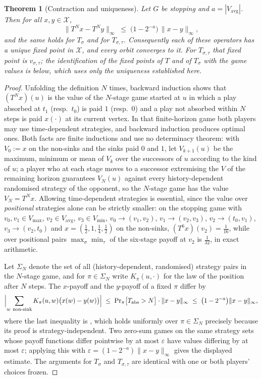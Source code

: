 \documentclass[11pt]{article}
\theoremstyle{plain}
\newtheorem{theorem}{Theorem}[section]
\theoremstyle{definition}
\newcommand{\Vmax}{V_{\max}}
\newcommand{\Vmin}{V_{\min}}
\newcommand{\Vavg}{V_{\mathrm{avg}}}
\begin{document}
\begin{theorem}[Contraction and uniqueness]\label{thm:contraction}
Let $G$ be stopping and $a=|\Vavg|$. Then for all $x,y\in\mathcal{X}$,
\[
  \lVert T^{N}x-T^{N}y\rVert_\infty\;\le\;\bigl(1-2^{-a}\bigr)\,\lVert x-y\rVert_\infty ,
\]
and the same holds for $T_\sigma$ and for $T_{\sigma,\tau}$. Consequently
each of these operators has a \emph{unique} fixed point in
$\mathcal{X}$, and every orbit converges to it. For $T_{\sigma,\tau}$
that fixed point is $v_{\sigma,\tau}$; the identification of the fixed
points of $T$ and of $T_\sigma$ with the game values is
 below, which uses only the uniqueness
established here.
\end{theorem}

\begin{proof}
Unfolding the definition $N$ times, backward induction shows that
$(T^{N}x)(u)$ is the value of the $N$-stage game started at $u$ in which
a play absorbed at $t_1$ (resp.\ $t_0$) is paid $1$ (resp.\ $0$) and a
play not absorbed within $N$ steps is paid $x(\cdot)$ at its current
vertex. In that finite-horizon game both players may use time-dependent
strategies, and backward induction produces optimal ones. Both facts are
finite inductions and use no determinacy theorem: with $V_0:=x$ on the
non-sinks and the sinks paid $0$ and $1$, let $V_{k+1}(u)$ be the maximum,
minimum or mean of $V_k$ over the successors of $u$ according to the kind
of $u$; a player who at each stage moves to a successor extremising the
$V$ of the remaining horizon guarantees $V_N(u)$ against every
history-dependent randomised strategy of the opponent, so the $N$-stage
game has the value $V_N=T^{N}x$. Allowing time-dependent strategies is
essential, since the value over \emph{positional} strategies alone can be
strictly smaller: on the stopping game with $v_0,v_1\in\Vmax$,
$v_2\in\Vavg$, $v_3\in\Vmin$, $v_0\to(v_1,v_2)$, $v_1\to(v_2,v_3)$,
$v_2\to(t_0,v_1)$, $v_3\to(v_2,t_0)$ and $x=(\tfrac12,1,\tfrac14,\tfrac12)$
on the non-sinks, $(T^{6}x)(v_2)=\tfrac1{16}$, while over positional pairs
$\max_\sigma\min_\tau$ of the six-stage payoff at $v_2$ is $\tfrac1{32}$,
in exact arithmetic.

Let $\Sigma_N$ denote the set of all (history-dependent, randomised)
strategy pairs in the $N$-stage game, and for $\pi\in\Sigma_N$ write
$K_\pi(u,\cdot)$ for the law of the position after $N$ steps. The
$x$-payoff and the $y$-payoff of a fixed $\pi$ differ by
\[
  \Bigl|\sum_{w\ \mathrm{non\text{-}sink}} K_\pi(u,w)\bigl(x(w)-y(w)\bigr)\Bigr|
  \;\le\;\Pr\nolimits_{\pi}\bigl[T_{\mathrm{abs}}>N\bigr]\cdot\lVert x-y\rVert_\infty
  \;\le\;\bigl(1-2^{-a}\bigr)\lVert x-y\rVert_\infty ,
\]
where the last inequality is , which holds uniformly
over $\pi\in\Sigma_N$ precisely because its proof is
strategy-independent. Two zero-sum games on the same strategy sets whose
payoff functions differ pointwise by at most $\varepsilon$ have values
differing by at most $\varepsilon$; applying this with
$\varepsilon=(1-2^{-a})\lVert x-y\rVert_\infty$ gives the displayed
estimate. The arguments for $T_\sigma$ and $T_{\sigma,\tau}$ are
identical with one or both players' choices frozen.


\end{proof}
\end{document}
